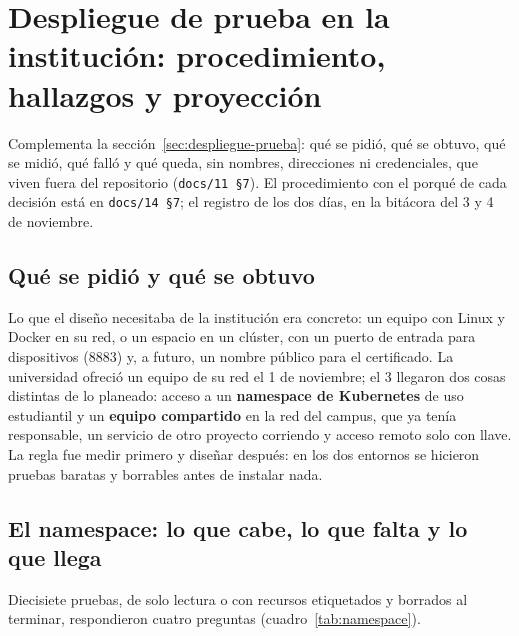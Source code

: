 \chapter[Despliegue de prueba en la institución]{Despliegue de prueba en la institución: procedimiento, hallazgos y proyección}
\label{anx:despliegue}

Complementa la sección~\ref{sec:despliegue-prueba}: qué se pidió, qué se obtuvo, qué se midió, qué falló y qué queda, sin nombres,
direcciones ni credenciales, que viven fuera del repositorio (\texttt{docs/11 §7}). El procedimiento con el porqué de cada decisión está en
\texttt{docs/14 §7}; el registro de los dos días, en la bitácora del 3 y 4 de noviembre.

\section{Qué se pidió y qué se obtuvo}

Lo que el diseño necesitaba de la institución era concreto: un equipo con Linux y Docker en su red, o un espacio en un clúster, con un
puerto de entrada para dispositivos (8883) y, a futuro, un nombre público para el certificado. La universidad ofreció un equipo de su red el 1 de
noviembre; el 3 llegaron dos cosas distintas de lo planeado: acceso a un \textbf{namespace de Kubernetes} de uso estudiantil y un
\textbf{equipo compartido} en la red del campus, que ya tenía responsable, un servicio de otro proyecto corriendo y acceso remoto solo con llave.
La regla fue medir primero y diseñar después: en los dos entornos se hicieron pruebas baratas y borrables antes de instalar nada.

\section{El namespace: lo que cabe, lo que falta y lo que llega}

Diecisiete pruebas, de solo lectura o con recursos etiquetados y borrados al terminar, respondieron cuatro preguntas (cuadro~\ref{tab:namespace}).

